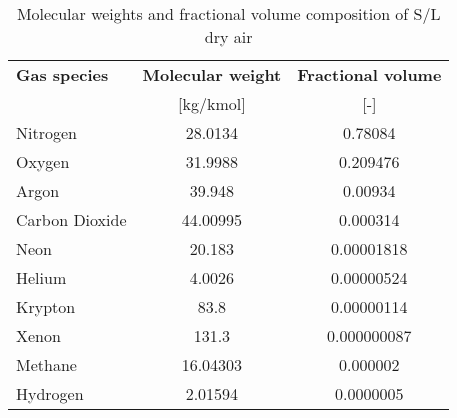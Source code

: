 \begin{table}
  \begin{center}
    \begin{tabular}{ l | S | S }
      \toprule
      \textbf{Gas species} & \textbf{Molecular weight} & \textbf{Fractional volume} \\
      {} & {[kg/kmol]} & {[-]} \\ \midrule
      Nitrogen       & 28.0134  & 0.78084     \\
      Oxygen         & 31.9988  & 0.209476    \\
      Argon          & 39.948   & 0.00934     \\
      Carbon Dioxide & 44.00995 & 0.000314    \\
      Neon           & 20.183   & 0.00001818  \\
      Helium         & 4.0026   & 0.00000524  \\
      Krypton        & 83.8     & 0.00000114  \\
      Xenon          & 131.3    & 0.000000087 \\
      Methane        & 16.04303 & 0.000002    \\
      Hydrogen       & 2.01594  & 0.0000005   \\
      \bottomrule
    \end{tabular}
    \caption{Molecular weights and fractional volume composition of S/L dry air \cite{NASA-TM-X-74335} }
  \end{center}
\end{table}
